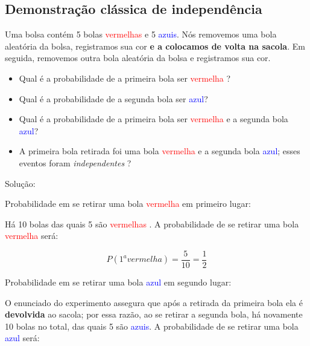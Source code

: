 \documentclass[
]{book}
\providecommand{\tightlist}{%
  \setlength{\itemsep}{0pt}\setlength{\parskip}{0pt}}
\begin{document}
\hfill\break

\hypertarget{demonstrauxe7uxe3o-cluxe1ssica-de-independuxeancia}{%
\subsection{Demonstração clássica de independência}\label{demonstrauxe7uxe3o-cluxe1ssica-de-independuxeancia}}

Uma bolsa contém 5 bolas \textcolor{red}{vermelhas} e 5 \textcolor{blue}{azuis}. Nós removemos uma bola aleatória da bolsa, registramos sua cor \textbf{e a colocamos de volta na sacola}. Em seguida, removemos outra bola aleatória da bolsa e registramos sua cor.

\hfill\break

\begin{itemize}
\tightlist
\item
  Qual é a probabilidade de a primeira bola ser \textcolor{red}{vermelha} ?\\
\item
  Qual é a probabilidade de a segunda bola ser \textcolor{blue}{azul}?\\
\item
  Qual é a probabilidade de a primeira bola ser \textcolor{red}{vermelha} e a segunda bola \textcolor{blue}{azul}?\\
\item
  A primeira bola retirada foi uma bola \textcolor{red}{vermelha} e a segunda bola \textcolor{blue}{azul}; esses eventos foram \emph{independentes} ?
\end{itemize}

\hfill\break

Solução:

Probabilidade em se retirar uma bola \textcolor{red}{vermelha} em primeiro lugar:

\hfill\break

Há 10 bolas das quais 5 são \textcolor{red}{vermelhas} . A probabilidade de se retirar uma bola \textcolor{red}{vermelha} será:

\hfill\break

\[
P(1^{a} vermelha)= \frac{5}{10}= \frac{1}{2}
\]

\hfill\break

Probabilidade em se retirar uma bola \textcolor{blue}{azul} em segundo lugar:

O enunciado do experimento assegura que após a retirada da primeira bola ela é \textbf{devolvida} ao sacola; por essa razão, ao se retirar a segunda bola, há novamente 10 bolas no total, das quais 5 são \textcolor{blue}{azuis}. A probabilidade de se retirar uma bola \textcolor{blue}{azul} será:
\end{document}
